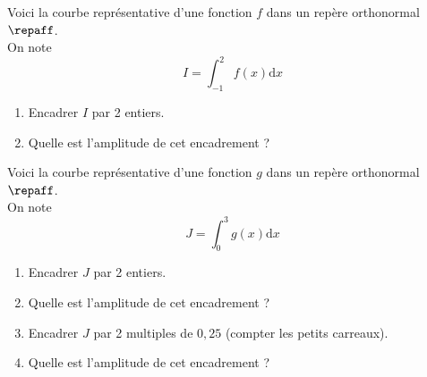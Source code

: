 \documentclass[a4paper,11pt,exos]{nsi} %
\begin{document}
\exo{}

\exo{}
	
		\begin{minipage}{6.5cm}
			\def\xmin{-2}	\def\xmax{4}	\def\ymin{-1}	\def\ymax{5}
			\def\F{-(\x+1)*(\x-3)}
		\end{minipage}
		\begin{minipage}{10.5cm}
			Voici la courbe représentative d'une fonction $f$ dans un repère orthonormal $\repaff$.\\
			On note $$\displaystyle I=\int_{-1}^{2}f(x)\text{d}x$$
			\begin{enumerate}
				\item 	Encadrer $I$ par 2 entiers.
				\item 	Quelle est l'amplitude de cet encadrement ?
			\end{enumerate}
		\end{minipage}
	
	\exo{}
	
\begin{minipage}{6.5cm}
	\def\xmin{-2}\def\xmax{4}\def\ymin{-1}\def\ymax{6}
	\def\F{5+(\x+1)*(\x-3)}
\end{minipage}
\begin{minipage}{10.5cm}
	Voici la courbe représentative d'une fonction $g$ dans un repère orthonormal $\repaff$.\\
On note $$\displaystyle J=\int_{0}^{3}g(x)\text{d}x$$
\begin{enumerate}
	\item 	Encadrer $J$ par 2 entiers.
	\item 	Quelle est l'amplitude de cet encadrement ?
	\item 	Encadrer $J$ par 2 multiples de $0,25$ (compter les petits carreaux).
	\item 	Quelle est l'amplitude de cet encadrement ?
\end{enumerate}
\end{minipage}	
\end{document}
